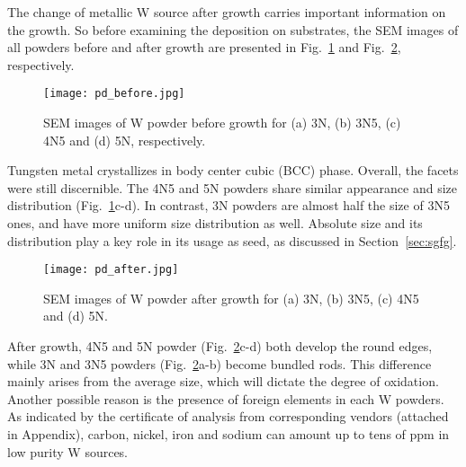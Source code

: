The change of metallic W source after growth carries important information on the growth. So before examining the deposition on substrates, the SEM images of all powders before and after growth are presented in Fig.~\ref{fig:pdbefore} and Fig.~\ref{fig:pdafter}, respectively.
\begin{figure}[htb]
\centering
\texttt{[image: pd\_before.jpg]}
\caption[SEM images of W powder before growth]{SEM images of W powder before growth for (a) 3N, (b) 3N5, (c) 4N5 and (d) 5N, respectively.}
\label{fig:pdbefore}
\end{figure}
Tungsten metal crystallizes in body center cubic (BCC) phase. Overall, the facets were still discernible. The 4N5 and 5N powders share similar appearance and size distribution (Fig.~\ref{fig:pdbefore}c-d). In contrast, 3N powders are almost half the size of 3N5 ones, and have more uniform size distribution as well. Absolute size and its distribution play a key role in its usage as seed, as discussed in Section~\ref{sec:sgfg}.
\begin{figure}[htb]
\centering
\texttt{[image: pd\_after.jpg]}
\caption[SEM images of W powder after growth]{SEM images of W powder after growth for (a) 3N, (b) 3N5, (c) 4N5 and (d) 5N. }
\label{fig:pdafter}
\end{figure}
After growth, 4N5 and 5N powder (Fig.~\ref{fig:pdafter}c-d) both develop the round edges, while 3N and 3N5 powders (Fig.~\ref{fig:pdafter}a-b) become bundled rods. This difference mainly arises from the average size, which will dictate the degree of oxidation. Another possible reason is the presence of foreign elements in each W powders. As indicated by the certificate of analysis from corresponding vendors (attached in Appendix), carbon, nickel, iron and sodium can amount up to tens of ppm in low purity W sources. 

